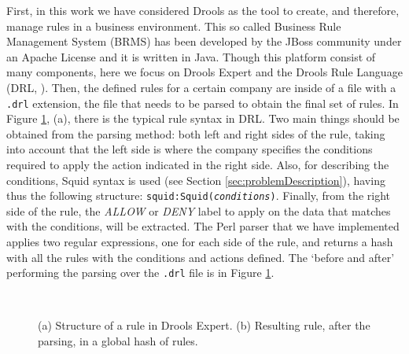 \documentclass{llncs}
\begin{document}
First, in this work we have considered Drools \cite{drools:site} as the tool to create, and therefore, manage rules in a business environment. This so called Business Rule Management System (BRMS) has been developed by the JBoss community under an Apache License and it is written in Java. Though this platform consist of many components, here we focus on Drools Expert and the Drools Rule Language (DRL, \cite{drools:doc}). Then, the defined rules for a certain company are inside of a file with a \texttt{.drl} extension, the file that needs to be parsed to obtain the final set of rules. In Figure \ref{fig:drools_hash}, (a), there is the typical rule syntax in DRL. Two main things should be obtained from the parsing method: both left and right sides of the rule, taking into account that the left side is where the company specifies the conditions required to apply the action indicated in the right side. Also, for describing the conditions, Squid syntax is used (see Section \ref{sec:problemDescription}), having thus the following structure: \texttt{squid:Squid(\textit{conditions})}. Finally, from the right side of the rule, the \textit{ALLOW} or \textit{DENY} label to apply on the data that matches with the conditions, will be extracted. The Perl parser that we have implemented applies two regular expressions, one for each side of the rule, and returns a hash with all the rules with the conditions and actions defined. The `before and after' performing the parsing over the \texttt{.drl} file is in Figure \ref{fig:drools_hash}.

\begin{figure}[htb]
\centering
{}
~
\caption{(a) Structure of a rule in Drools Expert. (b) Resulting rule, after the parsing, in a global hash of rules. \label{fig:drools_hash}}
\end{figure}
\end{document}
